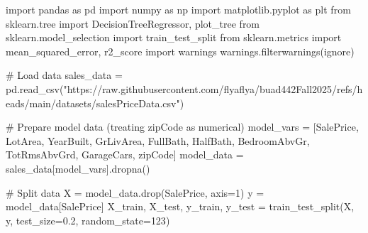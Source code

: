 \documentclass[
  letterpaper,
  DIV=11,
  numbers=noendperiod]{scrartcl}
\newenvironment{Shaded}{\begin{snugshade}}{\end{snugshade}}
\newcommand{\CommentTok}[1]{\textcolor[rgb]{0.37,0.37,0.37}{#1}}
\newcommand{\DecValTok}[1]{\textcolor[rgb]{0.68,0.00,0.00}{#1}}
\newcommand{\FloatTok}[1]{\textcolor[rgb]{0.68,0.00,0.00}{#1}}
\newcommand{\ImportTok}[1]{\textcolor[rgb]{0.00,0.46,0.62}{#1}}
\newcommand{\NormalTok}[1]{\textcolor[rgb]{0.00,0.23,0.31}{#1}}
\newcommand{\OperatorTok}[1]{\textcolor[rgb]{0.37,0.37,0.37}{#1}}
\newcommand{\StringTok}[1]{\textcolor[rgb]{0.13,0.47,0.30}{#1}}
\begin{document}
\begin{Shaded}
\begin{Highlighting}[]
\ImportTok{import}\NormalTok{ pandas }\ImportTok{as}\NormalTok{ pd}
\ImportTok{import}\NormalTok{ numpy }\ImportTok{as}\NormalTok{ np}
\ImportTok{import}\NormalTok{ matplotlib.pyplot }\ImportTok{as}\NormalTok{ plt}
\ImportTok{from}\NormalTok{ sklearn.tree }\ImportTok{import}\NormalTok{ DecisionTreeRegressor, plot\_tree}
\ImportTok{from}\NormalTok{ sklearn.model\_selection }\ImportTok{import}\NormalTok{ train\_test\_split}
\ImportTok{from}\NormalTok{ sklearn.metrics }\ImportTok{import}\NormalTok{ mean\_squared\_error, r2\_score}
\ImportTok{import}\NormalTok{ warnings}
\NormalTok{warnings.filterwarnings(}\StringTok{\textquotesingle{}ignore\textquotesingle{}}\NormalTok{)}

\CommentTok{\# Load data}
\NormalTok{sales\_data }\OperatorTok{=}\NormalTok{ pd.read\_csv(}\StringTok{"https://raw.githubusercontent.com/flyaflya/buad442Fall2025/refs/heads/main/datasets/salesPriceData.csv"}\NormalTok{)}

\CommentTok{\# Prepare model data (treating zipCode as numerical)}
\NormalTok{model\_vars }\OperatorTok{=}\NormalTok{ [}\StringTok{\textquotesingle{}SalePrice\textquotesingle{}}\NormalTok{, }\StringTok{\textquotesingle{}LotArea\textquotesingle{}}\NormalTok{, }\StringTok{\textquotesingle{}YearBuilt\textquotesingle{}}\NormalTok{, }\StringTok{\textquotesingle{}GrLivArea\textquotesingle{}}\NormalTok{, }\StringTok{\textquotesingle{}FullBath\textquotesingle{}}\NormalTok{, }
              \StringTok{\textquotesingle{}HalfBath\textquotesingle{}}\NormalTok{, }\StringTok{\textquotesingle{}BedroomAbvGr\textquotesingle{}}\NormalTok{, }\StringTok{\textquotesingle{}TotRmsAbvGrd\textquotesingle{}}\NormalTok{, }\StringTok{\textquotesingle{}GarageCars\textquotesingle{}}\NormalTok{, }\StringTok{\textquotesingle{}zipCode\textquotesingle{}}\NormalTok{]}
\NormalTok{model\_data }\OperatorTok{=}\NormalTok{ sales\_data[model\_vars].dropna()}

\CommentTok{\# Split data}
\NormalTok{X }\OperatorTok{=}\NormalTok{ model\_data.drop(}\StringTok{\textquotesingle{}SalePrice\textquotesingle{}}\NormalTok{, axis}\OperatorTok{=}\DecValTok{1}\NormalTok{)}
\NormalTok{y }\OperatorTok{=}\NormalTok{ model\_data[}\StringTok{\textquotesingle{}SalePrice\textquotesingle{}}\NormalTok{]}
\NormalTok{X\_train, X\_test, y\_train, y\_test }\OperatorTok{=}\NormalTok{ train\_test\_split(X, y, test\_size}\OperatorTok{=}\FloatTok{0.2}\NormalTok{, random\_state}\OperatorTok{=}\DecValTok{123}\NormalTok{)}


\end{Highlighting}
\end{Shaded}
\end{document}
